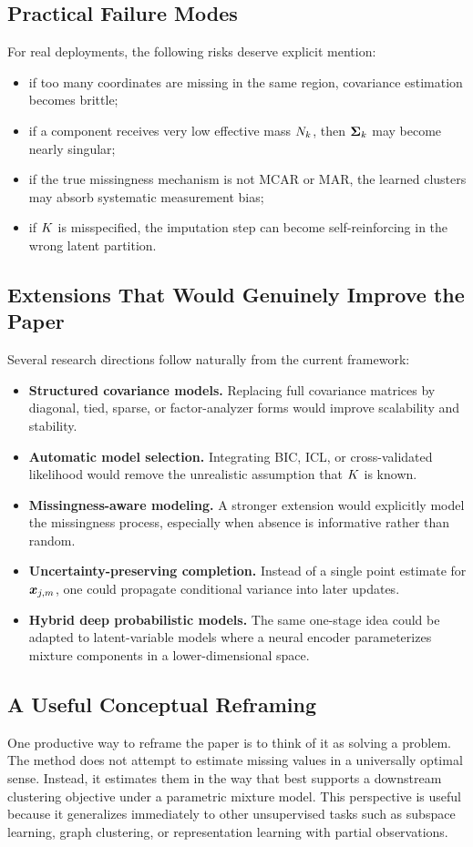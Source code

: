\subsection{Practical Failure Modes}
For real deployments, the following risks deserve explicit mention:
\begin{itemize}
    \item if too many coordinates are missing in the same region, covariance estimation becomes brittle;
    \item if a component receives very low effective mass $N_k$, then $\mathbf{\Sigma}_k$ may become nearly singular;
    \item if the true missingness mechanism is not MCAR or MAR, the learned clusters may absorb systematic measurement bias;
    \item if $K$ is misspecified, the imputation step can become self-reinforcing in the wrong latent partition.
\end{itemize}

\subsection{Extensions That Would Genuinely Improve the Paper}
Several research directions follow naturally from the current framework:
\begin{itemize}
    \item \textbf{Structured covariance models.} Replacing full covariance matrices by diagonal, tied, sparse, or factor-analyzer forms would improve scalability and stability.
    \item \textbf{Automatic model selection.} Integrating BIC, ICL, or cross-validated likelihood would remove the unrealistic assumption that $K$ is known.
    \item \textbf{Missingness-aware modeling.} A stronger extension would explicitly model the missingness process, especially when absence is informative rather than random.
    \item \textbf{Uncertainty-preserving completion.} Instead of a single point estimate for $\bm{x}_{j,m}$, one could propagate conditional variance into later updates.
    \item \textbf{Hybrid deep probabilistic models.} The same one-stage idea could be adapted to latent-variable models where a neural encoder parameterizes mixture components in a lower-dimensional space.
\end{itemize}

\subsection{A Useful Conceptual Reframing}
One productive way to reframe the paper is to think of it as solving a  problem. The method does not attempt to estimate missing values in a universally optimal sense. Instead, it estimates them in the way that best supports a downstream clustering objective under a parametric mixture model. This perspective is useful because it generalizes immediately to other unsupervised tasks such as subspace learning, graph clustering, or representation learning with partial observations.

